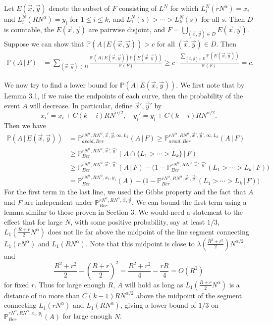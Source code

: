 \documentclass[12pt]{article}
\begin{document}
	Let $E(\vec{x},\vec{y})$ denote the subset of $F$ consisting of $L^N$ for which $L_i^N(rN^\alpha) = x_i$ and $L_i^N(RN^\alpha)=y_i$ for $1\leq i\leq k$, and $L_1^N(s) > \cdots > L_k^N(s)$ for all $s$. Then $D$ is countable, the $E(\vec{x},\vec{y})$ are pairwise disjoint, and $F = \bigcup_{(\vec{x},\vec{y})\in D} E(\vec{x},\vec{y})$. Suppose we can show that $\mathbb{P}(A\,|\,E(\vec{x},\vec{y})) > c$ for all $(\vec{x},\vec{y})\in D$. Then
	\begin{align*}
	\mathbb{P}(A\,|\,F) &= \sum_{(\vec{x},\vec{y})\in D} \frac{\mathbb{P}(A\,|\,E(\vec{x},\vec{y}))\mathbb{P}(E(\vec{x},\vec{y}))}{\mathbb{P}(F)} \geq c\cdot\frac{\sum_{(\vec{x},\vec{y})\in D} \mathbb{P}(E(\vec{x},\vec{y}))}{\mathbb{P}(F)} = c.
	\end{align*}
	
	We now try to find a lower bound for $\mathbb{P}(A\,|\,E(\vec{x},\vec{y}))$. We first note that by Lemma 3.1, if we raise the endpoints of each curve, then the probability of the event $A$ will decrease. In particular, define $\vec{x}',\vec{y}'$ by
	\[
	x_i' = x_i + C(k-i)RN^{\alpha/2}, \quad y_i' = y_i + C(k-i)RN^{\alpha/2}.
	\]
	Then we have
	\begin{align*}
	\mathbb{P}(A\,|\,E(\vec{x},\vec{y})) &= \mathbb{P}^{rN^\alpha, RN^\alpha,\vec{x},\vec{y},\infty,L_k}_{avoid,Ber} (A\,|\,F) \geq \mathbb{P}^{rN^\alpha, RN^\alpha,\vec{x}',\vec{y}',\infty,L_k}_{avoid,Ber} (A\,|\,F)\\
	&\geq \mathbb{P}^{rN^\alpha, RN^\alpha,\vec{x}',\vec{y}'}_{Ber} (A\cap\{L_1 > \cdots > L_k\}\,|\,F)\\
	&\geq \mathbb{P}^{rN^\alpha, RN^\alpha,\vec{x}',\vec{y}'}_{Ber} (A\,|\,F) - \big( 1 - \mathbb{P}^{rN^\alpha, RN^\alpha,\vec{x}',\vec{y}'}_{Ber} (L_1 > \cdots > L_k\,|\,F)\big)\\
	&= \mathbb{P}^{rN^\alpha, RN^\alpha,x_1,y_1}_{Ber} (A) - \big( 1 - \mathbb{P}^{rN^\alpha, RN^\alpha,\vec{x}',\vec{y}'}_{Ber} (L_1 > \cdots > L_k\,|\,F)\big)
	\end{align*}
	For the first term in the last line, we used the Gibbs property and the fact that $A$ and $F$ are independent under $\mathbb{P}^{rN^\alpha, RN^\alpha,\vec{x},\vec{y}}_{Ber}$. We can bound the first term using a lemma similar to those proven in Section 3. We would need a statement to the effect that for large $N$, with some positive probability, say at least $1/3$, $L_1(\frac{R+r}{2}N^\alpha)$ does not lie far above the midpoint of the line segment connecting $L_1(rN^\alpha)$ and $L_1(RN^\alpha)$. Note that this midpoint is close to $\lambda(\frac{R^2+r^2}{2})N^{\alpha/2}$, and
	\[
	\frac{R^2+r^2}{2} - \left(\frac{R+r}{2}\right)^2 = \frac{R^2 + r^2}{4} - \frac{rR}{4} = O(R^2)
	\]
	for fixed $r$. Thus for large enough $R$, $A$ will hold as long as $L_1(\frac{R+r}{2}N^\alpha)$ is a distance of no more than $C(k-1)RN^{\alpha/2}$ above the midpoint of the segment connecting $L_1(rN^\alpha)$ and $L_1(RN^\alpha)$, giving a lower bound of $1/3$ on $\mathbb{P}^{rN^\alpha, RN^\alpha,x_1,y_1}_{Ber}(A)$ for large enough $N$.
	
\end{document}
